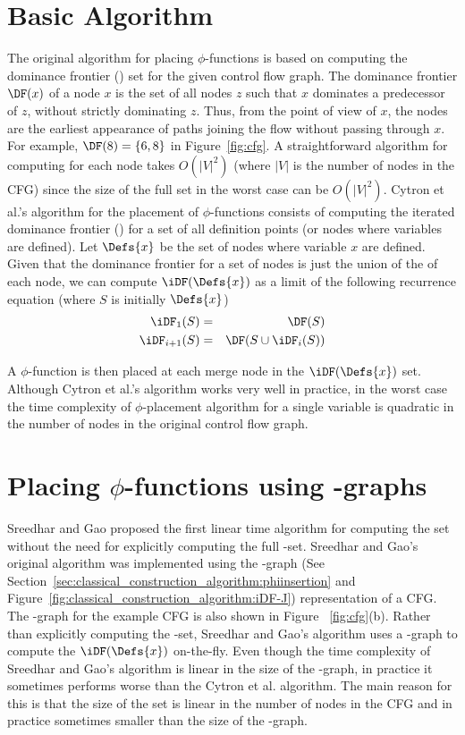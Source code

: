 {\section{Basic Algorithm}
The original algorithm for placing $\phi$-functions
is based on computing the dominance frontier  (\DF) set for the given control flow graph. The dominance frontier $\DF(x)$ of a node $x$ is the set of all nodes 
 $z$ such that $x$ dominates a predecessor of $z$, without strictly dominating $z$. Thus, from the point of view of $x$, the \DF nodes are the earliest appearance of paths joining the flow without passing through $x$.
For example, $\DF(8)= \{ 6, 8 \}$ in Figure~\ref{fig:cfg}. A straightforward algorithm for computing
\DF for each node takes $O(|V|^2)$ (where $|V|$ is the number of nodes in the CFG) since the size of the full \DF set in the worst case can be $O(|V|^2)$.
Cytron et al.'s algorithm for the placement of $\phi$-functions consists of computing the iterated dominance frontier (\iDF) for a set of all definition points (or nodes where
variables are defined). 
Let $\Defs{x}$ be the set of nodes where variable $x$ are  defined.
Given that the dominance frontier for a set of nodes is just the
union of the \DF of each node, we can compute $\iDF(\Defs{x})$ as a limit of
the following recurrence equation (where $S$ is initially $\Defs{x}$)
\begin{eqnarray*}
\iDF_1(S) &=& \DF(S) \\
\iDF_{i+1} (S) &=& \DF(S \cup \iDF_i(S)) 
\end{eqnarray*}

A $\phi$-function is then placed at each merge node in the  $\iDF(\Defs{x})$ set. 
Although Cytron et al.'s
algorithm works very well in practice, in the worst case the time complexity of $\phi$-placement algorithm for a single variable is quadratic in the number of nodes in the original control flow graph.


\section{Placing $\phi$-functions using \DJ-graphs}
Sreedhar and Gao proposed the first linear time algorithm for computing the \iDF set without the need for explicitly computing the full \DF-set. Sreedhar and Gao's original algorithm was implemented using the \DJ-graph (See Section~\ref{sec:classical_construction_algorithm:phiinsertion} and Figure~\ref{fig:classical_construction_algorithm:iDF-J}) representation of a CFG. 
The \DJ-graph for the example CFG is also shown in Figure ~\ref{fig:cfg}(b). Rather than explicitly computing the \DF-set, Sreedhar and Gao's algorithm uses a \DJ-graph to compute the  $\iDF(\Defs{x})$ on-the-fly. Even though the time complexity of Sreedhar and Gao's algorithm is linear in the size of the \DJ-graph, in practice it sometimes performs worse than the Cytron et al. algorithm. The main reason for this is that the size of the \DF set is linear in the number of nodes in the CFG 
and in practice sometimes smaller than the size of the \DJ-graph. 


}
